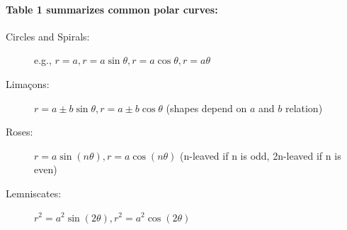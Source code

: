 \documentclass{article}
\begin{document}
\paragraph{Table 1 summarizes common polar curves:}
\begin{description}
    \item[Circles and Spirals:] e.g., $r=a, r=a\sin\theta, r=a\cos\theta, r=a\theta$
    \item[Limaçons:] $r=a\pm b\sin\theta, r=a\pm b\cos\theta$ (shapes depend on $a$ and $b$ relation)
    \item[Roses:] $r=a\sin(n\theta), r=a\cos(n\theta)$ (n-leaved if n is odd, 2n-leaved if n is even)
    \item[Lemniscates:] $r^2=a^2\sin(2\theta), r^2=a^2\cos(2\theta)$
\end{description}
\end{document}
